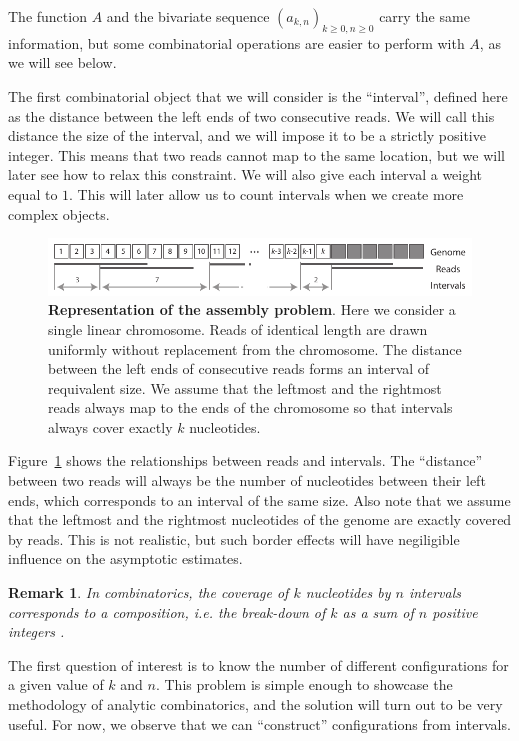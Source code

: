 \documentclass{article}
\newtheorem{remark}{Remark}
\begin{document}
The function $A$ and the bivariate sequence $(a_{k,n})_{k \geq 0, n \geq
0}$ carry the same information, but some combinatorial operations are
easier to perform with $A$, as we will see below.

The first combinatorial object that we will consider is the ``interval'',
defined here as the distance between the left ends of two consecutive
reads. We will call this distance the size of the interval, and we will
impose it to be a strictly positive integer. This means that two reads
cannot map to the same location, but we will later see how to relax this
constraint. We will also give each interval a weight equal to $1$. This
will later allow us to count intervals when we create more complex
objects.

\begin{figure}[h]
\centering
\includegraphics[scale=0.89]{Fig1.pdf}
\caption{\textbf{Representation of the assembly problem}. Here we consider
a single linear chromosome. Reads of identical length are drawn uniformly
without replacement from the chromosome. The distance between the left
ends of consecutive reads forms an interval of requivalent size. We assume
that the leftmost and the rightmost reads always map to the ends of the
chromosome so that intervals always cover exactly $k$ nucleotides.}
\label{fig:sketchass}
\end{figure}

Figure~\ref{fig:sketchass} shows the relationships between reads and
intervals. The ``distance'' between two reads will always be the number of
nucleotides between their left ends, which corresponds to an interval of
the same size. Also note that we assume that the leftmost and the
rightmost nucleotides of the genome are exactly covered by reads. This is
not realistic, but such border effects will have negiligible influence on
the asymptotic estimates.

\begin{remark}
In combinatorics, the coverage of $k$ nucleotides by $n$ intervals
corresponds to a \emph{composition}, \textit{i.e.} the break-down of $k$
as a sum of $n$ positive integers \cite{AnalComb2009}.
\end{remark}

The first question of interest is to know the number of different
configurations for a given value of $k$ and $n$. This problem is simple
enough to showcase the methodology of analytic combinatorics, and the
solution will turn out to be very useful. For now, we observe that we can
``construct'' configurations from intervals.
\end{document}
